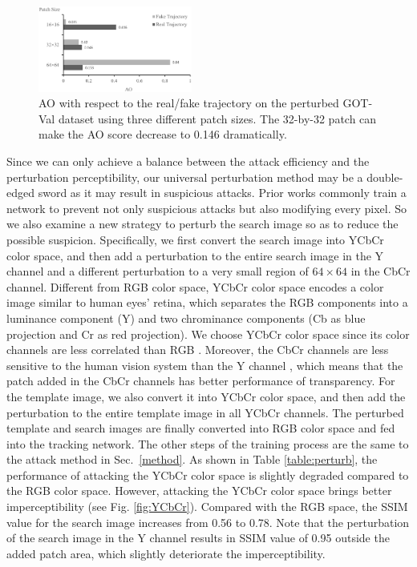 \documentclass[journal]{IEEEtran}
\begin{document}
\begin{figure}[t!]
  \begin{center}
    \includegraphics[width=0.45\textwidth]{images_imperceptible/patch_size/patch_size.png}
  \end{center}
  \vspace{-3mm}
  \caption{AO with respect to the real/fake trajectory on the perturbed GOT-Val dataset using three different patch sizes. The 32-by-32 patch can make the AO score decrease to 0.146 dramatically.}
  \label{fig:patch_size_table}
  \vspace{-3mm}
\end{figure}

Since we can only achieve a balance between the attack efficiency and the perturbation perceptibility, our universal perturbation method may be a double-edged sword as it may result in suspicious attacks. Prior works commonly train a network to prevent not only suspicious attacks but also modifying every pixel. So we also examine a new strategy to perturb the search image so as to reduce the possible suspicion. Specifically, we first convert the search image into YCbCr color space, and then add a perturbation to the entire search image in the Y channel and a different perturbation to a very small region of $64 \times 64$ in the CbCr channel. Different from RGB color space, YCbCr color space encodes a color image similar to human eyes’ retina, which separates the RGB components into a luminance component (Y) and two chrominance components (Cb as blue projection and Cr as red projection). We choose YCbCr color space since its color channels are less correlated than RGB \cite{8630918}. Moreover, the CbCr channels are less sensitive to the human vision system than the Y channel \cite{8630918}, which means that the patch added in the CbCr channels has better performance of transparency.
For the template image, we also convert it into YCbCr color space, and then add the perturbation to the entire template image in all YCbCr channels. The perturbed template and search images are finally converted into RGB color space and fed into the tracking network. The other steps of the training process are the same to the attack method in Sec.~\ref{method}. As shown in Table \ref{table:perturb}, the performance of attacking the YCbCr color space is slightly degraded compared to the RGB color space. However, attacking the YCbCr color space brings better imperceptibility (see Fig. \ref{fig:YCbCr}). Compared with the RGB space, the SSIM value for the search image increases from 0.56 to 0.78. Note that the perturbation of the search image in the Y channel results in SSIM value of 0.95 outside the added patch area, which slightly deteriorate the imperceptibility.
\end{document}
